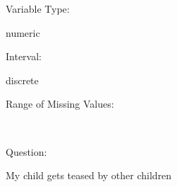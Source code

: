 \documentclass[
]{article}
\begin{document}
\begin{minipage}[t]{0.3\linewidth}

Variable Type:

\end{minipage}%
\begin{minipage}[t]{0.7\linewidth}

numeric

\end{minipage}

\begin{minipage}[t]{0.3\linewidth}

Interval:

\end{minipage}%
\begin{minipage}[t]{0.7\linewidth}

discrete

\end{minipage}

\begin{minipage}[t]{0.3\linewidth}

Range of Missing Values:

\end{minipage}%
\begin{minipage}[t]{0.7\linewidth}

~

\end{minipage}

\begin{minipage}[t]{0.3\linewidth}

Question:

\end{minipage}%
\begin{minipage}[t]{0.7\linewidth}

My child gets teased by other children

\end{minipage}
\end{document}
